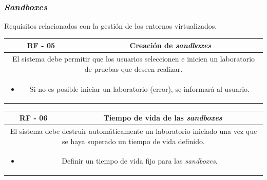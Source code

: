                 \newpage
            
            
            \subsubsection{\textit{Sandboxes}}
            
                Requisitos relacionados con la gestión de los entornos virtualizados.
                
                \begin{table}[!htbp]
                    \centering
                    \begin{tabular}{|c|c|}
                        \hline
                        \textbf{RF - 05} & \textbf{Creación de \textit{sandboxes}} \\
                        \hline
                        \multicolumn{2}{|p{15cm}|}{
                            El sistema debe permitir que los usuarios seleccionen e inicien un laboratorio de pruebas que deseen realizar.
                        } \\
                        \hline
                        \multicolumn{2}{|p{15cm}|}{
                            \begin{itemize}
                                \item Si no es posible iniciar un laboratorio (error), se informará al usuario.
                            \end{itemize}
                            } \\
                        \hline
                    \end{tabular}
                    \label{tab:RF5}
                \end{table}
                
                \begin{table}[!htbp]
                    \centering
                    \begin{tabular}{|c|c|}
                        \hline
                        \textbf{RF - 06} & \textbf{Tiempo de vida de las \textit{sandboxes}} \\
                        \hline
                        \multicolumn{2}{|p{15cm}|}{
                            El sistema debe destruir automáticamente un laboratorio iniciado una vez que se haya superado un tiempo de vida definido.
                        } \\
                        \hline
                        \multicolumn{2}{|p{15cm}|}{
                            \begin{itemize}
                                \item Definir un tiempo de vida fijo para las \textit{sandboxes}.
                            \end{itemize}
                            } \\
                        \hline
                    \end{tabular}
                    \label{tab:RF6}
                \end{table}
                
